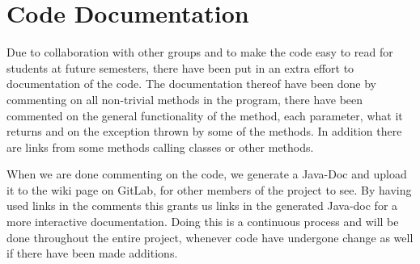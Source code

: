 \section{Code Documentation} \label{sec:code_documentation}
Due to collaboration with other groups and to make the code easy to read for students at future semesters, there have been put in an extra effort to documentation of the code. The documentation thereof have been done by commenting on all non-trivial methods in the program, there have been commented on the general functionality of the method, each parameter, what it returns and on the exception thrown by some of the methods. In addition there are links from some methods calling classes or other methods. 

When we are done commenting on the code, we generate a Java-Doc and upload it to the wiki page on GitLab, for other members of the project to see. By having used links in the comments this grants us links in the generated Java-doc for a more interactive documentation. 
Doing this is a continuous process and will be done throughout the entire project, whenever code have undergone change as well if there have been made additions.